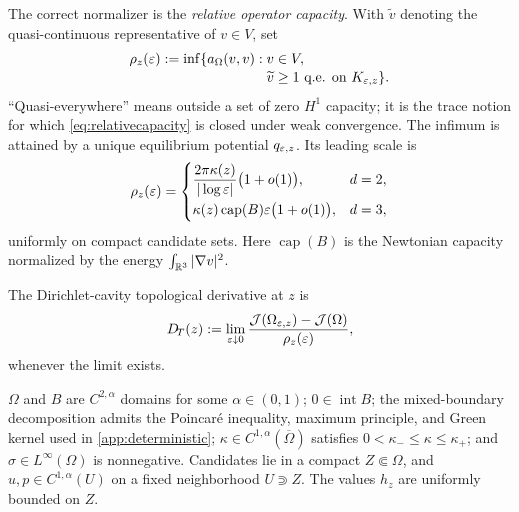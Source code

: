 The correct normalizer is the \emph{relative operator capacity}.  With
$\widetilde v$ denoting the quasi-continuous representative of $v\in V$, set
\begin{equation}
 \begin{split}
 \rho_z(\varepsilon):=\inf\{a_\Omega(v,v):{}&v\in V,\\[-2pt]
 &\widetilde v\ge1\text{ q.e. on }K_{\varepsilon,z}\}.
 \end{split}
 \label{eq:relativecapacity}
\end{equation}
``Quasi-everywhere'' means outside a set of zero $H^1$ capacity; it is the
trace notion for which \cref{eq:relativecapacity} is closed under weak
convergence.  The infimum is attained by a unique equilibrium potential
$q_{\varepsilon,z}$.  Its leading scale is
\begin{equation}
 \rho_z(\varepsilon)=
 \begin{cases}
  \displaystyle \frac{2\pi\kappa(z)}{|\log\varepsilon|}
       \bigl(1+o(1)\bigr), & d=2,\\[7pt]
  \displaystyle \kappa(z)\operatorname{cap}(B)\varepsilon
       \bigl(1+o(1)\bigr), & d=3,
 \end{cases}
 \label{eq:capacityscaling}
\end{equation}
uniformly on compact candidate sets.  Here $\operatorname{cap}(B)$ is the
Newtonian capacity normalized by the energy $\int_{\mathbb{R}^3}|\nabla v|^2$.

\begin{definition}
The Dirichlet-cavity topological derivative at $z$ is
\begin{equation}
 D_{\!T}(z):=\lim_{\varepsilon\downarrow0}
 \frac{\mathcal{J}(\Omega_{\varepsilon,z})-\mathcal{J}(\Omega)}{\rho_z(\varepsilon)},
 \label{eq:tddefinition}
\end{equation}
whenever the limit exists.
\end{definition}

\begin{assumption}
\label{ass:regularity}
$\Omega$ and $B$ are $C^{2,\alpha}$ domains for some $\alpha\in(0,1)$;
$0\in\operatorname{int}B$; the mixed-boundary decomposition admits the
Poincar\'e inequality, maximum principle, and Green kernel used in
\cref{app:deterministic};
$\kappa\in C^{1,\alpha}(\overline\Omega)$ satisfies
$0<\kappa_-\le\kappa\le\kappa_+$; and
$\sigma\in L^\infty(\Omega)$ is nonnegative.  Candidates lie in a compact
$Z\Subset\Omega$, and $u,p\in C^{1,\alpha}(U)$ on a fixed neighborhood
$U\Supset Z$.  The values $h_z$ are uniformly bounded on $Z$.
\end{assumption}

